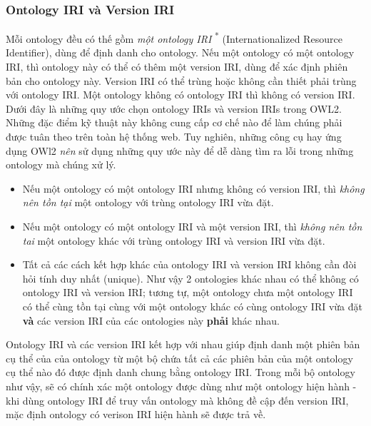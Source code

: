 \subsubsection{Ontology IRI và Version IRI}
Mỗi ontology đều có thế gồm \textit{một ontology IRI} \cite{iri} \textsuperscript{*} (Internationalized Resource Identifier), dùng để định danh cho ontology. Nếu một ontology có một ontology IRI, thì ontology này có thể có thêm một version IRI, dùng để xác định phiên bản cho ontology này. Version IRI có thể trùng hoặc không cần thiết phải trùng với ontology IRI. Một ontology không có ontology IRI thì không có version IRI.
Dưới đây là những quy ước chọn ontology IRIs và version IRIs trong OWL2. Những đặc điểm kỹ thuật này không cung cấp cơ chế nào để làm chúng phải được tuân theo trên toàn hệ thống web. Tuy nghiên, những công cụ hay ứng dụng OWl2 \textit{nên} sử dụng những quy ước này để dễ dàng tìm ra lỗi trong những ontology mà chúng xử lý.
{\let\thefootnote\relax{}
}
\begin{itemize}
	\item Nếu một ontology có một ontology IRI nhưng không có version IRI, thì \textit{không nên tồn tại} một ontology với trùng ontology IRI vừa đặt.
	\item Nếu một ontology có một ontology IRI và một version IRI, thì \textit{không nên tồn tai} một ontology khác với trùng ontology IRI và version IRI vừa đặt.
	\item Tất cả các cách kết hợp khác của ontology IRI và version IRI không cần đòi hỏi tính duy nhất (unique). Như vậy 2 ontologies khác nhau có thể không có ontology IRI và version IRI; tương tự, một ontology chưa một ontology IRI có thể cùng tồn tại cùng với một ontology khác có cùng ontology IRI vừa đặt \textbf{và} các version IRI của các ontologies này \textbf{phải} khác nhau.
\end{itemize}
Ontology IRI và các version IRI kết hợp với nhau giúp định danh một phiên bản cụ thể của của ontology từ một bộ chứa tất cả các phiên bản của một ontology cụ thể nào đó được định danh chung bằng ontology IRI. Trong mỗi bộ ontology như vậy, sẽ có chính xác một ontology được dùng như một ontology hiện hành - khi dùng ontology IRI để truy vấn ontology mà không đề cập đến version IRI, mặc định ontology có verison IRI hiện hành sẽ được trả về.


